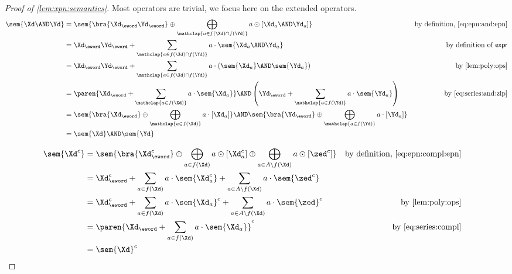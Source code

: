 \documentclass[a4paper,USenglish]{lipics}
\begin{document}
\begin{proof}[Proof of \cref{lem:xpn:semantics}]
  Most operators are trivial, we focus here on the extended operators.
  \begin{align*}
    \sem{\Xd \AND \Yd}
    & = \sem{\bra{\Xd_\eword\Yd_\eword}
      \oplus
      \bigoplus_{\mathclap{a \in f(\Xd) \cap f(\Yd)}} a \odot [\Xd_a \AND \Yd_a]}
    & \text{by definition, \cref{eq:epn:and:epn}}
    \\
    & = \Xd_\eword\Yd_\eword
      + \sum_{\mathclap{a \in f(\Xd) \cap f(\Yd)}} a \cdot \sem{\Xd_a \AND \Yd_a}
    & \text{by definition of $\mathsf{expr}$}
    \\
    & = \Xd_\eword\Yd_\eword
      + \sum_{\mathclap{a \in f(\Xd) \cap f(\Yd)}} a \cdot \left(\sem{\Xd_a} \AND \sem{\Yd_a}\right)
    & \text{by \cref{lem:poly:ops}}
    \\
    & = \paren{\Xd_\eword + \sum_{\mathclap{a \in f(\Xd)}} a \cdot \sem{\Xd_a}}
      \AND
      \left(\Yd_\eword + \sum_{\mathclap{a \in f(\Yd)}} a \cdot \sem{\Yd_a}\right)
    & \text{by \cref{eq:series:and:zip}}
    \\
    & = \sem{\bra{\Xd_\eword} \oplus \bigoplus_{\mathclap{a \in f(\Xd)}} a \cdot [\Xd_a]}
      \AND
      \sem{\bra{\Yd_\eword} \oplus \bigoplus_{\mathclap{a \in f(\Yd)}} a \cdot [\Yd_a]}
    \\
    & = \sem{\Xd} \AND \sem{\Yd}
  \end{align*}

  \begin{align*}
    \sem{\Xd^{c}}
    & = \sem{\bra{\Xd_\eword^{c}}
      \oplus \bigoplus_{a \in f(\Xd)} a \odot [\Xd_a^{c}] \oplus \bigoplus_{a \in A\setminus f(\Xd)} a \odot [\zed^{c}]}
    & \text{by definition, \cref{eq:epn:compl:epn}}
    \\
    & = \Xd_\eword^{c}
      + \sum_{a \in f(\Xd)} a \cdot \sem{\Xd_a^{c}} + \sum_{a \in A\setminus f(\Xd)} a \cdot \sem{\zed^{c}}
    \\
    & = \Xd_\eword^{c}
      + \sum_{a \in f(\Xd)} a \cdot \sem{\Xd_a}^{c} + \sum_{a \in A\setminus f(\Xd)} a \cdot \sem{\zed}^{c}
    & \text{by \cref{lem:poly:ops}}
    \\
    & = \paren{\Xd_\eword + \sum_{a \in f(\Xd)} a \cdot \sem{\Xd_a}}^{c}
    & \text{by \cref{eq:series:compl}}
    \\
    & = \sem{\Xd}^{c}
    && \hfill\qedhere
  \end{align*}
\end{proof}
\end{document}
